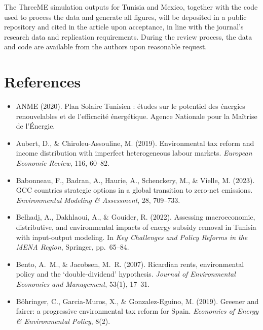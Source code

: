 \documentclass[12pt, a4paper]{article}
\begin{document}
The ThreeME simulation outputs for Tunisia and Mexico, together with the code used to process the data and generate all figures, will be deposited in a public repository and cited in the article upon acceptance, in line with the journal's research data and replication requirements. During the review process, the data and code are available from the authors upon reasonable request.

\newpage
\section*{References}

\begin{itemize}[label={}, leftmargin=2em, itemindent=-2em, itemsep=2pt]

\item ANME (2020). Plan Solaire Tunisien : études sur le potentiel des énergies renouvelables et de l'efficacité énergétique. Agence Nationale pour la Maîtrise de l'Énergie.

\item Aubert, D., \& Chiroleu-Assouline, M. (2019). Environmental tax reform and income distribution with imperfect heterogeneous labour markets. \textit{European Economic Review}, 116, 60--82.

\item Babonneau, F., Badran, A., Haurie, A., Schenckery, M., \& Vielle, M. (2023). GCC countries strategic options in a global transition to zero-net emissions. \textit{Environmental Modeling \& Assessment}, 28, 709--733.

\item Belhadj, A., Dakhlaoui, A., \& Gouider, R. (2022). Assessing macroeconomic, distributive, and environmental impacts of energy subsidy removal in Tunisia with input-output modeling. In \textit{Key Challenges and Policy Reforms in the MENA Region}, Springer, pp.~65--84.

\item Bento, A.~M., \& Jacobsen, M.~R. (2007). Ricardian rents, environmental policy and the `double-dividend' hypothesis. \textit{Journal of Environmental Economics and Management}, 53(1), 17--31.

\item Böhringer, C., Garcia-Muros, X., \& Gonzalez-Eguino, M. (2019). Greener and fairer: a progressive environmental tax reform for Spain. \textit{Economics of Energy \& Environmental Policy}, 8(2).


\end{itemize}
\end{document}
